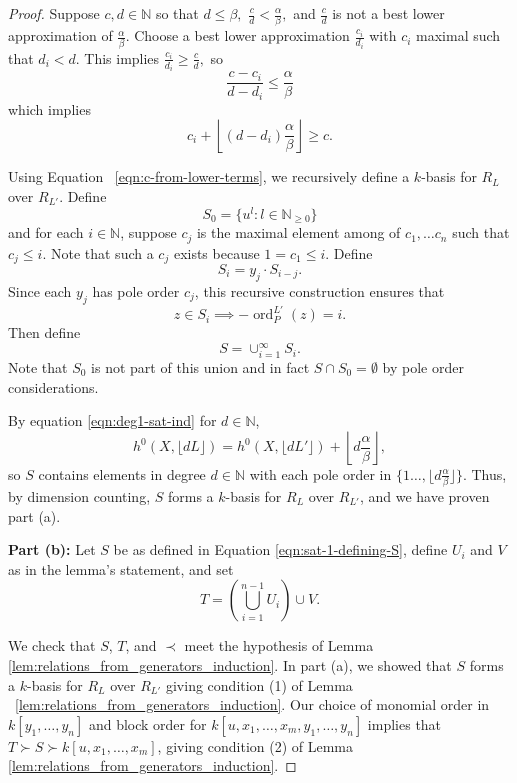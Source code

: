 \documentclass{amsart}
\theoremstyle{plain}
\theoremstyle{definition}
\theoremstyle{remark}
\numberwithin{equation}{section}
\newcommand\BN{{\mathbb N}}
\DeclareMathOperator{\ord}{ord}
\newcommand{\halfcan}{L}
\begin{document}
\begin{proof}
Suppose $c,d \in \BN$ so that $d\le \beta,$  $\frac{c}{d} < \frac{\alpha}{
\beta},$ and $\frac{c}{d}$ is not a best lower approximation of $\frac{\alpha}{\beta}$. Choose a
best lower approximation $\frac{c_i}{d_i}$ with $c_i$ maximal such that $d_i< d$.  This implies $\frac{c_i}{d_i}\ge \frac{c}{d},$ so 
\[
	\frac{c-c_i}{d-d_i}\le \frac{\alpha}{\beta}
\]
which implies
\begin{equation}\label{eqn:c-from-lower-terms}
	c_i +\left\lfloor (d-d_i) \frac{\alpha}{\beta} \right\rfloor \ge c.
\end{equation}

Using Equation ~\ref{eqn:c-from-lower-terms}, we recursively define a $k$-basis for $R_\halfcan$ over $R_{\halfcan'}$. Define 
\[
	S_0 = \{u^l : l \in \BN_{\ge 0}\}
\]
and for each $i \in \BN$, suppose $c_j$ is the maximal element among of $c_1, \ldots c_n$ such that $c_j \le i.$ Note that such a $c_j$ exists because $1=c_1\le i.$ Define
\[
	S_i = y_j \cdot S_{i-j}.
\]
Since each $y_j$ has pole order $c_j$, this recursive construction ensures that 
\[
	z\in S_i \implies -\ord_P^{\halfcan'}(z)=i.
\]
Then define 
\begin{equation}\label{eqn:sat-1-defining-S}
	S = \cup_{i=1}^{\infty} S_i.  
\end{equation}
Note that $S_0$ is not part of this union and in fact $S\cap S_0 = \emptyset$ by pole order considerations.

By equation \ref{eqn:deg1-sat-ind} for $d \in \BN$,
\[
	h^0(X, \lfloor{d\halfcan}\rfloor) = h^0(X,\lfloor d\halfcan'
		\rfloor) + \left\lfloor d\frac{\alpha} {\beta} \right \rfloor,
\] 
so $S$ contains elements in degree $d \in \BN$ with each pole order in $\{1 \ldots, \lfloor d\frac{\alpha}{\beta}\rfloor\}$.  Thus, by dimension counting, $S$ forms a $k$-basis for $R_\halfcan$ over $R_{\halfcan'}$, and we have proven part (a).

{\bf Part (b):}
Let $S$ be as defined in Equation \ref{eqn:sat-1-defining-S}, define $U_i$ and $V$ as in the lemma's statement, and set
\[
	T = \left(\bigcup_{i=1}^{n-1} U_i \right) \cup V.
\]

We check that $S$, $T$, and $\prec$ meet the hypothesis of Lemma \ref{lem:relations_from_generators_induction}.  In part (a), we showed that $S$ forms a $k$-basis for $R_\halfcan$ over $R_{\halfcan'}$ giving condition (1) of Lemma ~\ref{lem:relations_from_generators_induction}.  Our choice of monomial order in $k[y_1, \ldots, y_n]$ and block order for $k[u, x_1, \ldots, x_m, y_1, \ldots, y_n]$ implies that $T\succ S\succ k[u, x_1, \ldots, x_m]$, giving condition (2) of Lemma \ref{lem:relations_from_generators_induction}.  


\end{proof}
\end{document}
